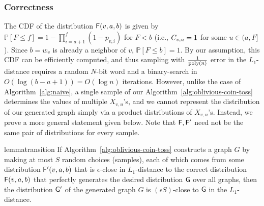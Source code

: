 \iffalse
\subsubsection{Correctness}

The CDF of the distribution $\mathsf{F}(v,a,b)$ is given by $\mathbb P[F \leq f] = 1-\prod_{i=a+1}^{f} (1-p_{v,i})$ for $F<b$
(i.e., $C_{v,u} = \mathsf{1}$ for some $u \in (a,F]$).
Since $b=w_v$ is already a neighbor of $v$, $\mathbb P[F \leq b] = 1$.
By our assumption, this CDF can be efficiently computed, and thus sampling with $\frac{1}{\mathrm{poly}(n)}$ error in the $L_1$-distance requires a random $N$-bit word and a binary-search in $O(\log (b-a+1)) = O(\log n)$ iterations.
However, unlike the case of Algorithm~\ref{alg:naive}, a single sample of our Algorithm~\ref{alg:oblivious-coin-toss} determines the values of multiple $X_{v,u}$'s, and we cannot represent the distribution of our generated graph simply via a product distributions of $X_{v,u}$'s.
Instead, we prove a more general statement given below.
Note that $\mathsf{F}, \mathsf{F}'$ need not be the same pair of distributions for every sample.
\begin{restatable}{lemma}{transition}\label{lemma:transition}
If Algorithm~\ref{alg:oblivious-coin-toss} constructs a graph $G$ by making at most $S$ random choices (samples), each of which comes from some distribution $\mathsf{F}'(v,a,b)$ that is $\epsilon$-close in $L_1$-distance to the correct distribution $\mathsf{F}(v,a,b)$ that perfectly generates the desired distribution $\mathsf{G}$ over all graphs, then the distribution $\mathsf{G}'$ of the generated graph $G$ is $(\epsilon S)$-close to $\mathsf{G}$ in the $L_1$-distance.
\end{restatable}
